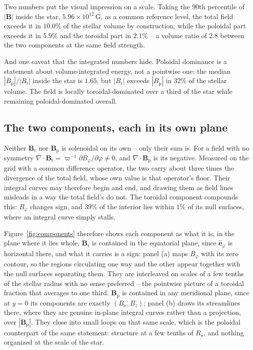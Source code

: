 \documentclass{aa}
\begin{document}
Two numbers put the visual impression on a scale. Taking the $90$th
percentile of $|\mathbf{B}|$ inside the star, $5.96\times10^{12}$\,G, as
a common reference level, the total field exceeds it in $10.0\%$ of the
stellar volume by construction, while the poloidal part exceeds it in
$5.9\%$ and the toroidal part in $2.1\%$ -- a volume ratio of $2.8$
between the two components at the same field strength.

And one caveat that the integrated numbers hide. Poloidal dominance is a
statement about volume-integrated energy, not a pointwise one: the median
$|B_{\mathrm{p}}|/|B_{\mathrm{t}}|$ inside the star is $1.65$, but
$|B_{\mathrm{t}}|$ exceeds $|B_{\mathrm{p}}|$ in $32\%$ of the stellar
volume. The field is locally toroidal-dominated over a third of the star
while remaining poloidal-dominated overall.

\subsection{The two components, each in its own plane}
\label{sec:components}

Neither $\mathbf{B}_{\mathrm{t}}$ nor $\mathbf{B}_{\mathrm{p}}$ is
solenoidal on its own -- only their sum is. For a field with no symmetry
$\nabla\!\cdot\!\mathbf{B}_{\mathrm{t}} =
\varpi^{-1}\partial B_\varphi/\partial\varphi \neq 0$, and
$\nabla\!\cdot\!\mathbf{B}_{\mathrm{p}}$ is its negative. Measured on the
grid with a common difference operator, the two carry about three times
the divergence of the total field, whose own value is that operator's
floor. Their integral curves may therefore begin and end, and drawing
them as field lines misleads in a way the total field's do not. The
toroidal component compounds this: $B_\varphi$ changes sign, and $39\%$
of the interior lies within $1\%$ of its null surfaces, where an integral
curve simply stalls.

Figure~\ref{fig:components} therefore shows each component as what it is,
in the plane where it lies whole. $\mathbf{B}_{\mathrm{t}}$ is contained
in the equatorial plane, since $\hat{\mathbf{e}}_\varphi$ is horizontal
there, and what it carries is a sign: panel (a) maps $B_\varphi$ with its
zero contour, so the regions circulating one way and the other appear
together with the null surfaces separating them. They are interleaved on
scales of a few tenths of the stellar radius with no sense preferred --
the pointwise picture of a toroidal fraction that averages to one third.
$\mathbf{B}_{\mathrm{p}}$ is contained in any meridional plane, since at
$y=0$ its components are exactly $(B_x, B_z)$; panel (b) draws its
streamlines there, where they are genuine in-plane integral curves rather
than a projection, over $|\mathbf{B}_{\mathrm{p}}|$. They close into small
loops on that same scale, which is the poloidal counterpart of the same
statement: structure at a few tenths of $R_\star$, and nothing organized
at the scale of the star.
\end{document}
